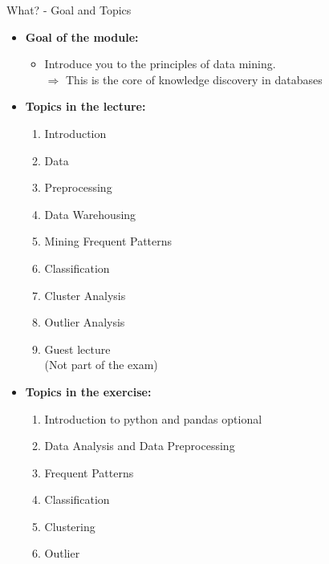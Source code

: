 \begin{frame}{What? - Goal and Topics}
	\begin{itemize}
		\item \textbf{Goal of the module:}
		      \begin{itemize}
			      \item Introduce you to the principles of data mining. \\
			            $\Rightarrow$ This is the core of knowledge discovery in databases
		      \end{itemize}
		\item \textbf{Topics in the lecture:}
		      \vspace*{-1\multicolsep}
		      \begin{multicols}{2}
			      \begin{enumerate}
				      \item Introduction
				      \item Data
				      \item Preprocessing
				      \item Data Warehousing
				      \item Mining Frequent Patterns
				      \item Classification
				      \item Cluster Analysis
				      \item Outlier Analysis
				      \item {\color{gray}Guest lecture} \\
				            {\color{gray}(Not part of the exam)}
			      \end{enumerate}
		      \end{multicols}
		      \vspace*{-1\multicolsep}
		\item \textbf{Topics in the exercise:}
		      \vspace*{-1\multicolsep}
		      \begin{multicols}{2}
			      \begin{enumerate}
				      \item Introduction to python and pandas {\color{gray}optional}
				      \item Data Analysis and Data Preprocessing
				      \item Frequent Patterns
				      \item Classification
				      \item Clustering
				      \item Outlier
			      \end{enumerate}
		      \end{multicols}
		      \
	\end{itemize}
\end{frame}

